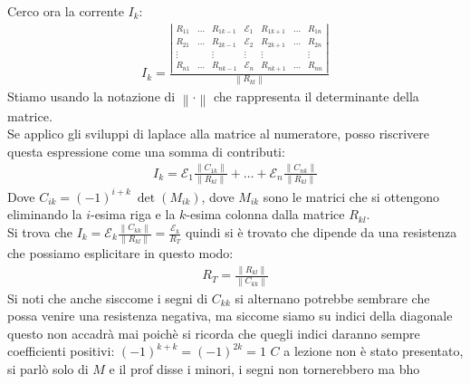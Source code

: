 \documentclass[a4paper, oneside]{article}
\newcommand{\E}{\mathcal{E}}
\begin{document}
Cerco ora la corrente $I_k$:
\begin{gather*}
    I_k = \frac{\left\lvert \begin{matrix}
        R_{11} & \dots & R_{1k-1} & \E_1 & R_{1k+1} & \dots & R_{1n}\\
        R_{21} & \dots & R_{2k-1} & \E_2 & R_{2k+1} & \dots & R_{2n}\\
        \vdots &  & \vdots & \vdots & \vdots &  & \vdots\\
        R_{n1} & \dots & R_{nk-1} & \mathcal{E}_n & R_{nk+1} & \dots & R_{nn}
    \end{matrix} \right\rvert }{\left\lVert R_{kl}\right\rVert }
\end{gather*}
Stiamo usando la notazione di $\left\lVert \cdot \right\rVert$ che rappresenta il determinante della matrice.\\
Se applico gli sviluppi di laplace alla matrice al numeratore, posso riscrivere questa espressione come una somma di contributi:
\begin{gather*}
    I_k = \mathcal{E}_1 \frac{\left\lVert C_{1k} \right\rVert }{\left\lVert R_{kl}\right\rVert } + \dots + \mathcal{E}_n \frac{\left\lVert C_{nk} \right\rVert }{\left\lVert R_{kl} \right\rVert }
\end{gather*}
Dove $C_{ik} = (-1)^{i+k} \ \det(M_{ik})$, dove $M_{ik}$ sono le matrici che si ottengono eliminando la $i$-esima riga e la $k$-esima colonna dalla matrice $R_{kl}$.\\ 
Si trova che $I_k = \mathcal{E}_k \frac{\left\lVert C_{kk} \right\rVert }{\left\lVert R_{kl} \right\rVert } = \frac{\mathcal{E}_k}{R_T}$ quindi si è trovato che dipende da una resistenza che possiamo esplicitare in questo modo:
\begin{gather*}
    R_T = \frac{\left\lVert R_{kl} \right\rVert }{\left\lVert C_{kk} \right\rVert }
\end{gather*}
Si noti che anche sisccome i segni di $C_{kk}$ si alternano potrebbe sembrare che possa venire una resistenza negativa, ma siccome siamo su indici della diagonale questo non accadrà mai poichè si ricorda che quegli indici daranno sempre coefficienti positivi: $(-1)^{k+k} = (-1)^{2k} = 1$
\tiny{$C$ a lezione non è stato presentato, si parlò solo di $M$ e il prof disse i minori, i segni non tornerebbero ma bho} \normalsize
\end{document}
